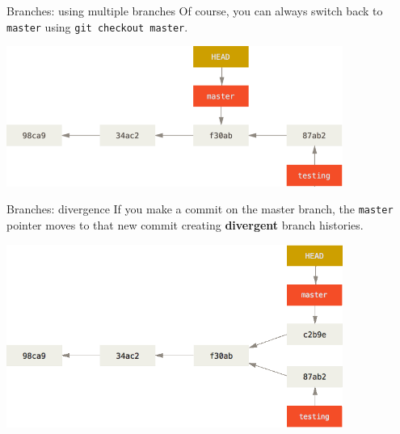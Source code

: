 \documentclass{beeper}
\begin{document}
\begin{frame}{Branches: using multiple branches}
    Of course, you can always switch back to \texttt{master} using \texttt{git
    checkout master}.

    \begin{center}
        \includegraphics[width=110mm]{graphics/branching4}
    \end{center}
\end{frame}

\begin{frame}{Branches: divergence}
    If you make a commit on the master branch, the \texttt{master} pointer moves
    to that new commit creating \textbf{divergent} branch histories.

    \begin{center}
        \includegraphics[width=110mm]{graphics/branching5}
    \end{center}
\end{frame}
\end{document}
